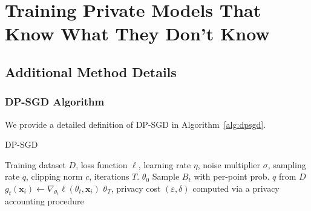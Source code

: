 \chapter{Training Private Models That Know What They Don't Know}

\section{Additional Method Details}

\subsection{DP-SGD Algorithm}

We provide a detailed definition of DP-SGD in Algorithm~\ref{alg:dpsgd}.

	\vspace{10pt}
    \begin{algorithm}[H]
	\caption{DP-SGD~\citep{abadi2016deep}}\label{alg:dpsgd}
	\begin{algorithmic}[1]
	\Require Training dataset $D$, loss function $\ell$, learning rate $\eta$, noise multiplier $\sigma$, sampling rate $q$, clipping norm $c$, iterations $T$.
		 $\theta_0$
		\State Sample $B_t$ with per-point prob. $q$ from $D$
		\State $g_t(\bm{x}_i) \gets \nabla_{\theta_t} \ell(\theta_t, \bm{x}_i)$
		\EndFor
		\label{alg:dpsgd_clipping}
		\label{alg:dpsgd_noise}
		\EndFor
		 $\theta_T$, privacy cost $(\varepsilon, \delta)$ computed via a privacy accounting procedure
	\end{algorithmic}
\end{algorithm}




